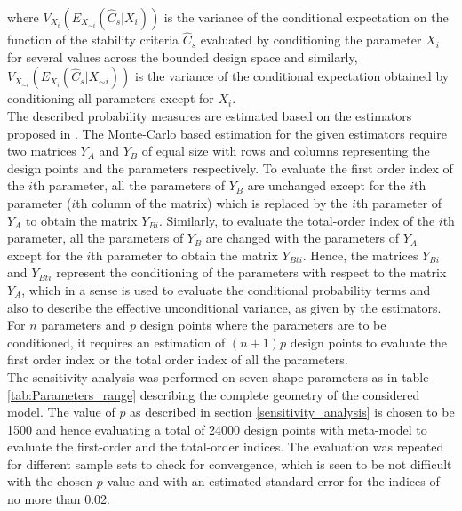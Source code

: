 where ${V_{X_i}(E_{X_{\sim i}}(\hat C_s|X_i))}$ is the variance of the conditional expectation on the function of the stability criteria $\hat C_s$ evaluated by conditioning the parameter $X_i$ for several values across the bounded design space and similarly, ${V_{X_{\sim i}}(E_{X_i}(\hat C_s|X_{\sim i}))}$ is the variance of the conditional expectation obtained by conditioning all parameters except for $X_i$. \\

The described probability measures are estimated based on the estimators proposed in . The Monte-Carlo based estimation for the given estimators require two matrices $Y_A$ and $Y_B$ of equal size with rows and columns representing the design points and the parameters respectively. To evaluate the first order index of the $i$th parameter, all the parameters of $Y_B$ are unchanged except for the $i$th parameter ($i$th column of the matrix) which is replaced by the $i$th parameter of $Y_A$ to obtain the matrix $Y_{Bi}$. Similarly, to evaluate the total-order index of the $i$th parameter, all the parameters of $Y_B$ are changed with the parameters of $Y_A$ except for the $i$th parameter to obtain the matrix $Y_{Bti}$. Hence, the matrices $Y_{Bi}$ and $Y_{Bti}$ represent the conditioning of the parameters with respect to the matrix $Y_A$, which in a sense is used to evaluate the conditional probability terms and also to describe the effective unconditional variance, as given by the estimators. For $n$ parameters and $p$ design points where the parameters are to be conditioned, it requires an estimation of $(n+1)p$ design points to evaluate the first order index or the total order index of all the parameters.\\

The sensitivity analysis was performed on seven shape parameters as in table \ref{tab:Parameters_range} describing the complete geometry of the considered model. The value of $p$ as described in section \ref{sensitivity_analysis} is chosen to be 1500 and hence evaluating a total of 24000 design points with meta-model to evaluate the first-order and the total-order indices. The evaluation was repeated for different sample sets to check for convergence, which is seen to be not difficult with the chosen $p$ value and with an estimated standard error for the indices of no more than 0.02.\\

